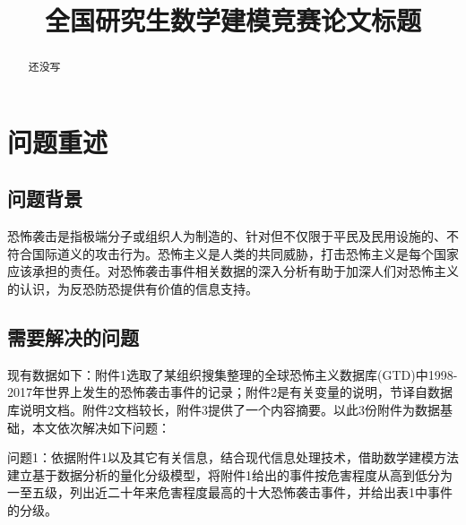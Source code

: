 \documentclass[bwprint]{gmcmthesis}
\title{全国研究生数学建模竞赛论文标题}
\begin{document}
 
\maketitle
 
\begin{abstract}
还没写
\end{abstract}

\pagestyle{plain}

\tableofcontents
\newpage

\section{问题重述}

\subsection{问题背景}
恐怖袭击是指极端分子或组织人为制造的、针对但不仅限于平民及民用设施的、不符合国际道义的攻击行为。恐怖主义是人类的共同威胁，打击恐怖主义是每个国家应该承担的责任。对恐怖袭击事件相关数据的深入分析有助于加深人们对恐怖主义的认识，为反恐防恐提供有价值的信息支持。
\subsection{需要解决的问题}
现有数据如下：附件1选取了某组织搜集整理的全球恐怖主义数据库(GTD)中1998-2017年世界上发生的恐怖袭击事件的记录；附件2是有关变量的说明，节译自数据库说明文档。附件2文档较长，附件3提供了一个内容摘要。以此3份附件为数据基础，本文依次解决如下问题：

问题1：依据附件1以及其它有关信息，结合现代信息处理技术，借助数学建模方法建立基于数据分析的量化分级模型，将附件1给出的事件按危害程度从高到低分为一至五级，列出近二十年来危害程度最高的十大恐怖袭击事件，并给出表1中事件的分级。
\end{document}
